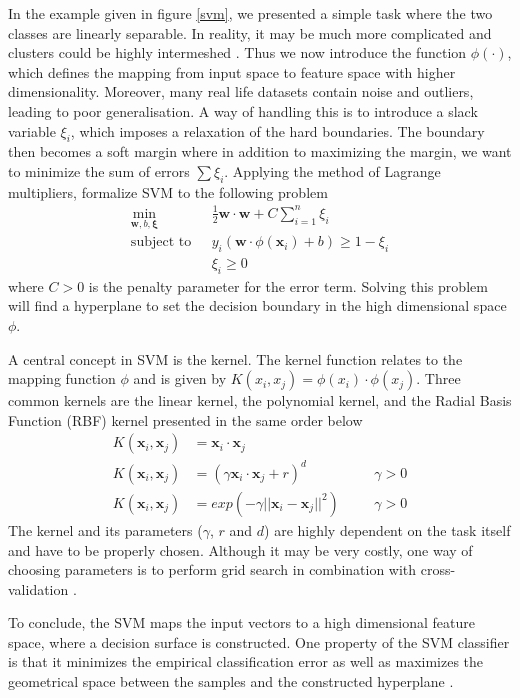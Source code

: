 In the example given in figure \ref{svm}, we presented a simple task where the two classes are linearly separable. In reality, it may be much more complicated and clusters could be highly intermeshed \citep{campbell2011}. Thus we now introduce the function $\phi(\cdot)$, which defines the mapping from input space to feature space with higher dimensionality. Moreover, many real life datasets contain noise and outliers, leading to poor generalisation. A way of handling this is to introduce a slack variable $\xi_i$, which imposes a relaxation of the hard boundaries. The boundary then becomes a soft margin where in addition to maximizing the margin, we want to minimize the sum of errors $\sum \xi_i$. Applying the method of Lagrange multipliers, \citet{campbell2011} formalize SVM to the following problem
\begin{align}
    \nonumber
    \min_{\bm{w},b,\bm{\xi}}\text{~~}&\frac{1}{2}\bm{w} \cdot \bm{w}+C\sum_{i=1}^{n} \xi_i \\ 
    \text{subject to~~}&y_i(\bm{w}\cdot \phi(\bm{x}_i)+b)\geq 1-\xi_i \label{svmeq}\\ 
    &\xi_i\geq 0 \nonumber
\end{align}
where $C>0$ is the penalty parameter for the error term. Solving this problem will find a hyperplane to set the decision boundary in the high dimensional space $\phi$.

A central concept in SVM is the kernel. The kernel function relates to the mapping function $\phi$ and is given by $K(x_i,x_j)=\phi(x_i)\cdot \phi(x_j)$. Three common kernels are the linear kernel, the polynomial kernel, and the Radial Basis Function (RBF) kernel presented in the same order below
\begin{align}
K(\bm{x}_i,\bm{x}_j)&=\bm{x}_i \cdot \bm{x}_j & \nonumber \\ 
K(\bm{x}_i,\bm{x}_j)&=(\gamma \bm{x}_i \cdot \bm{x}_j + r)^d \text{~~~~~}&\gamma>0\\
K(\bm{x}_i,\bm{x}_j)&=exp(-\gamma ||\bm{x}_i-\bm{x}_j||^2) \text{~~~~~}&\gamma>0 \nonumber
\end{align}
The kernel and its parameters ($\gamma$, $r$ and $d$) are highly dependent on the task itself and have to be properly chosen. Although it may be very costly, one way of choosing parameters is to perform grid search in combination with cross-validation \citep{Hsu10apractical}.

To conclude, the SVM maps the input vectors to a high dimensional feature space, where a decision surface is constructed. One property of the SVM classifier is that it minimizes the empirical classification error as well as maximizes the geometrical space between the samples and the constructed hyperplane \citep{Cortes1995}.


